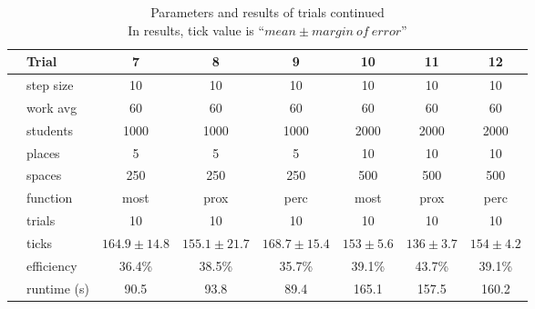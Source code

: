 \documentclass[11pt]{article} %
\begin{document}
\begin{table}[]
\footnotesize
\centering
\begin{tabular}{l|l|ccc|ccc}
 & Trial & 7 & 8 & 9 & 10 & 11 & 12  \\ \hline
  \parbox[t]{2mm}{} 
 & step size 	& 10  			& 10  			& 10 			& 10 					& 10 				& 10  \\
 & work avg 	& 60 			&  60 			& 60			& 60 					& 60 				& 60 \\
 & students 	& 1000 			& 1000 			& 1000 			& 2000 					& 2000 				& 2000 \\
 & places 		& 5 			& 5 			& 5 			& 10 					& 10 				& 10 \\
 & spaces 		& 250 			& 250 			& 250 			& 500 					& 500 				& 500 \\
 & function 	& most 			& prox 			& perc 			& most 					& prox 				& perc \\
 & trials 		& 10 			& 10 			& 10 			& 10 					& 10 				& 10 \\ \hline
\parbox[t]{2mm}{} 
 & ticks 		& $164.9\pm 14.8$ 	& $155.1\pm 21.7$ 	& $168.7\pm 15.4 $	& $153\pm 5.6 $	& $136\pm 3.7 $	& $154\pm 4.2$ \\
 & efficiency 	& 36.4\%			& 38.5\%			& 35.7\%				& 39.1\%				& 43.7\%				& 39.1\% \\
 & runtime (s) 	& 90.5			& 	93.8		& 	89.4			& 165.1			& 157.5			& 160.2
\end{tabular}
\caption{Parameters and results of trials continued \\ \footnotesize In results, tick value is ``$mean \pm margin \: of \: error$''}
\end{table}


\end{document}
